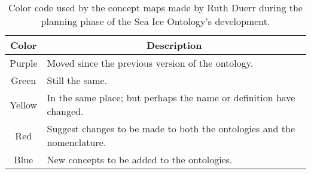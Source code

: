 \begin{table}
	\newcommand*{\thead}[1]{\multicolumn{1}{|c|}{\bfseries #1}}
	\centering
	\begin{tabular}{ | c | l |}
		\hline
		\textbf{Color} & \thead{Description} \\
		\hline
		Purple & Moved since the previous version of the ontology.\\
		\hline
		Green & Still the same.\\
		\hline
		Yellow & In the same place; but perhaps the name or definition have changed.\\
		\hline
		Red & Suggest changes to be made to both the ontologies and the nomenclature.\\
		\hline
		Blue & New concepts to be added to the ontologies.\\
		\hline
	\end{tabular}
	\label{ColorTable}
	\caption{Color code used by the concept maps made by Ruth Duerr during the planning phase of the Sea Ice Ontology's development.}
\end{table}

